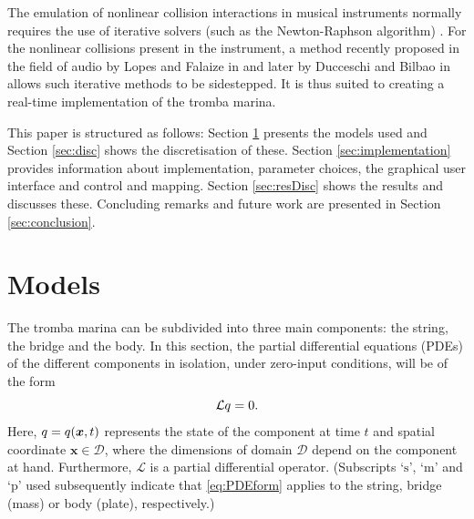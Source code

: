     The emulation of nonlinear collision interactions in musical instruments normally requires the use of iterative solvers (such as the Newton-Raphson algorithm) \cite{Bilbao15}. For the nonlinear collisions present in the instrument, a method recently proposed in the field of audio by Lopes and Falaize in \cite{Lopes:SMC2020, Falaize2016a:SMC2020, Falaize2016b:SMC2020} and later by Ducceschi and Bilbao in~\cite{Ducceschi2019} allows such iterative methods to be sidestepped. It is thus suited  to creating a real-time implementation of the tromba marina.
    
    This paper is structured as follows: Section \ref{sec:models} presents the models used and Section \ref{sec:disc} shows the discretisation of these. Section \ref{sec:implementation} provides information about implementation, parameter choices, the graphical user interface and control and mapping. Section \ref{sec:resDisc} shows the results and discusses these. Concluding remarks and future work are presented in Section \ref{sec:conclusion}.
    
    \section{Models}\label{sec:models}
    The tromba marina can be subdivided into three main components: the string, the bridge and the body. In this section, the partial differential equations (PDEs) of the different components in isolation, under zero-input conditions, will be of the form
    \begin{equation}\label{eq:PDEform}
        \mathcal{L}q = 0.
    \end{equation}
    Here, $q = q(\boldsymbol{x},t)$ represents the state of the component at time $t$ and spatial coordinate $\boldsymbol{x}\in\mathcal{D}$, where the dimensions of domain $\mathcal{D}$ depend on the component at hand. Furthermore, $\mathcal{L}$ is a partial differential operator. (Subscripts `$\text{s}$', `$\text{m}$' and `$\text{p}$' used subsequently indicate that \eqref{eq:PDEform} applies to the string, bridge (mass) or body (plate), respectively.)
    
